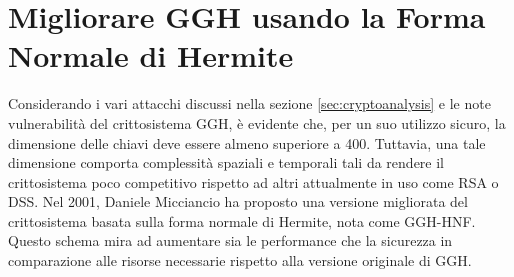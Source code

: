 \chapter{Migliorare GGH usando la Forma Normale di Hermite}
\label{cap:GGH-HNF}
%
%
Considerando i vari attacchi discussi nella sezione \ref{sec:cryptoanalysis} e le note vulnerabilità 
del crittosistema GGH, è evidente che, per un suo utilizzo sicuro, la dimensione delle chiavi deve essere almeno superiore a 400. Tuttavia, una tale 
dimensione comporta complessità spaziali e temporali tali da rendere il crittosistema
poco competitivo rispetto ad altri attualmente in uso come RSA o DSS. Nel 2001, Daniele 
Micciancio \cite{HNF01} ha proposto una versione migliorata del crittosistema basata sulla 
forma normale di Hermite, nota come GGH-HNF. Questo schema mira ad aumentare sia le 
performance che la sicurezza in comparazione alle 
risorse necessarie rispetto alla versione originale di GGH.


%
%
